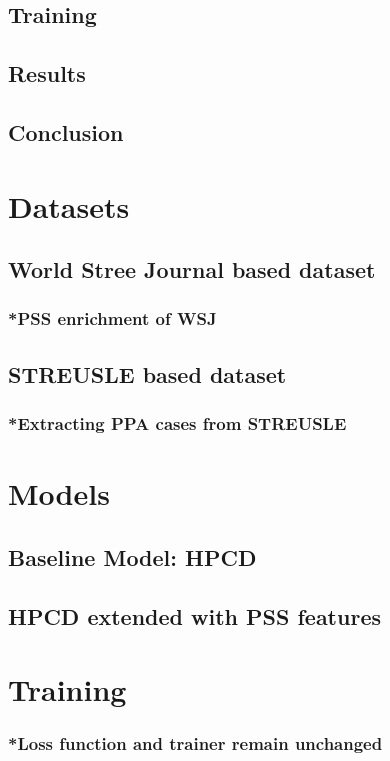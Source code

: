 \subsection{Training}
\subsection{Results}
\subsection{Conclusion}
\pagebreak

\section{Datasets}
\subsection{World Stree Journal based dataset}
\subsubsection{*PSS enrichment of WSJ}
\subsection{STREUSLE based dataset}
\subsubsection{*Extracting PPA cases from STREUSLE}

\section{Models}
\subsection{Baseline Model: HPCD}
\subsection{HPCD extended with PSS features}

\section{Training}
\subsubsection{*Loss function and trainer remain unchanged}
